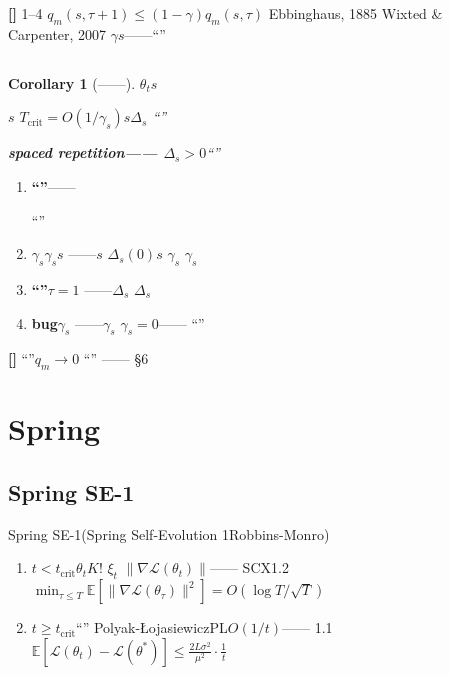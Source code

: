 \documentclass[11pt,a4paper]{article}
\newtheorem{corollary}[theorem]{Corollary}
\theoremstyle{remark}
\newcommand{\E}{\mathbb{E}}
\newcommand{\rigorous}{\textnormal{\textbf{[]}}}
\newcommand{\heuristic}{\textnormal{\textbf{[]}}}
\begin{document}
\rigorous{} \textbf{}1--4
\textbf{}$q_m(s, \tau+1) \leq (1-\gamma)q_m(s,\tau)$
Ebbinghaus, 1885
Wixted \& Carpenter, 2007
$\gamma$$s$——``''

\subsection{}

\begin{corollary}[——]
\label{cor:spaced_repetition}
$\theta_t$$s$

\textbf{$s$}
$T_{\text{crit}} = O(1/\gamma_s)$$s$$\Delta_s$
``''

\textbf{spaced repetition——
$\Delta_s > 0$}``''
\end{corollary}

\textbf{}

\begin{enumerate}[label=(\arabic*)]
    \item \textbf{``''}——
          
          ``''
          
    \item \textbf{$\gamma_s$}$\gamma_s$$s$
          ——$s$
          $\Delta_s(0)$$s$
          $\gamma_s$
          $\gamma_s$
    \item \textbf{``''}$\tau = 1$
          ——$\Delta_s$
          $\Delta_s$\textbf{}
    \item \textbf{bug}$\gamma_s$
          \textbf{}——$\gamma_s$
          $\gamma_s = 0$——
          ``''
\end{enumerate}

\heuristic{} \textbf{}``''$q_m \to 0$
``''
——
\S6

\section{Spring}

\subsection{Spring SE-1}

Spring SE-1(Spring Self-Evolution 1Robbins-Monro)
\textbf{}

\begin{enumerate}[label=\,\arabic*:, leftmargin=*]
    \item \textbf{$t < t_{\text{crit}}$}$\theta_t$$K!$
          $\xi_t$
          $\|\nabla\mathcal{L}(\theta_t)\|$——
          SCX\cite{scx2026spring_convergence}1.2
          $\min_{\tau \leq T} \E[\|\nabla\mathcal{L}(\theta_\tau)\|^2] = O(\log T / \sqrt{T})$
    \item \textbf{$t \geq t_{\text{crit}}$}``''
          Polyak-ŁojasiewiczPL$O(1/t)$——
          1.1$\E[\mathcal{L}(\theta_t) - \mathcal{L}(\theta^*)] \leq \frac{2L\sigma^2}{\mu^2} \cdot \frac{1}{t}$
\end{enumerate}
\end{document}
